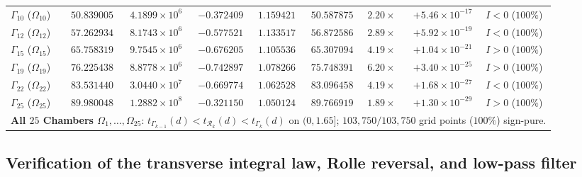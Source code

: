 \documentclass[11pt,a4paper,reqno]{amsart}
\theoremstyle{definition}
\theoremstyle{remark}
\numberwithin{equation}{section}
\begin{document}
\begin{table}[htbp]
\begin{tabular}{lrrrrrrrc}
$\Gamma_{10}$ ($\Omega_{10}$) & $50.839005$ & $4.1899 \times 10^6$ & $-0.372409$ & $1.159421$ & $50.587875$ & $2.20\times$ & $+5.46 \times 10^{-17}$ & $I < 0$ ($100\%$) \\
$\Gamma_{12}$ ($\Omega_{12}$) & $57.262934$ & $8.1743 \times 10^6$ & $-0.577521$ & $1.133517$ & $56.872586$ & $2.89\times$ & $+5.92 \times 10^{-19}$ & $I < 0$ ($100\%$) \\
$\Gamma_{15}$ ($\Omega_{15}$) & $65.758319$ & $9.7545 \times 10^6$ & $-0.676205$ & $1.105536$ & $65.307094$ & $4.19\times$ & $+1.04 \times 10^{-21}$ & $I > 0$ ($100\%$) \\
$\Gamma_{19}$ ($\Omega_{19}$) & $76.225438$ & $8.8778 \times 10^6$ & $-0.742897$ & $1.078266$ & $75.748391$ & $6.20\times$ & $+3.40 \times 10^{-25}$ & $I > 0$ ($100\%$) \\
$\Gamma_{22}$ ($\Omega_{22}$) & $83.531440$ & $3.0440 \times 10^7$ & $-0.669774$ & $1.062528$ & $83.096458$ & $4.19\times$ & $+1.68 \times 10^{-27}$ & $I < 0$ ($100\%$) \\
$\Gamma_{25}$ ($\Omega_{25}$) & $89.980048$ & $1.2882 \times 10^8$ & $-0.321150$ & $1.050124$ & $89.766919$ & $1.89\times$ & $+1.30 \times 10^{-29}$ & $I > 0$ ($100\%$) \\
\midrule
\multicolumn{9}{l}{\textbf{All $25$ Chambers $\Omega_1, \dots, \Omega_{25}$}: $t_{\Gamma_{k-1}}(d) < t_{\mathcal{R}_k}(d) < t_{\Gamma_k}(d)$ on $(0, 1.65]$; $103{,}750/103{,}750$ grid points ($100\%$) sign-pure.} \\
\bottomrule
\end{tabular}
\end{table}

\subsection{Verification of the transverse integral law, Rolle reversal, and low-pass filter}\label{subsec:num_integral}
\end{document}
